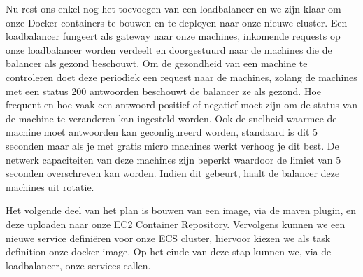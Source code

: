 \documentclass{article}
\begin{document}
	\par
	Nu rest ons enkel nog het toevoegen van een loadbalancer en we zijn klaar om onze Docker containers te bouwen en te deployen naar onze nieuwe cluster. Een loadbalancer fungeert als gateway naar onze machines, inkomende requests op onze loadbalancer worden verdeelt en doorgestuurd naar de machines die de balancer als gezond beschouwt. Om de gezondheid van een machine te controleren doet deze periodiek een request naar de machines, zolang de machines met een status 200 antwoorden beschouwt de balancer ze als gezond. Hoe frequent en hoe vaak een antwoord positief of negatief moet zijn om de status van de machine te veranderen kan ingesteld worden. Ook de snelheid waarmee de machine moet antwoorden kan geconfigureerd worden, standaard is dit 5 seconden maar als je met gratis micro machines werkt verhoog je dit best. De netwerk capaciteiten van deze machines zijn beperkt waardoor de limiet van 5 seconden overschreven kan worden. Indien dit gebeurt, haalt de balancer deze machines uit rotatie.
	\par
	Het volgende deel van het plan is bouwen van een image, via de maven plugin, en deze uploaden naar onze EC2 Container Repository. Vervolgens kunnen we een nieuwe service definiëren voor onze ECS cluster, hiervoor kiezen we als task definition onze docker image. Op het einde van deze stap kunnen we, via de loadbalancer, onze services callen.
\end{document}
